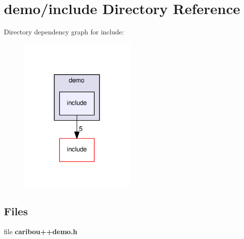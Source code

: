 \section{demo/include Directory Reference}
\label{dir_8271dc69a47e9aa72917d024cda4f903}
Directory dependency graph for include\-:\nopagebreak
\begin{figure}[H]
\begin{center}
\leavevmode
\includegraphics[width=166pt]{dir_8271dc69a47e9aa72917d024cda4f903_dep}
\end{center}
\end{figure}
\subsection*{Files}
\begin{DoxyCompactItemize}
\item 
file {\bf caribou++demo.\-h}
\end{DoxyCompactItemize}

